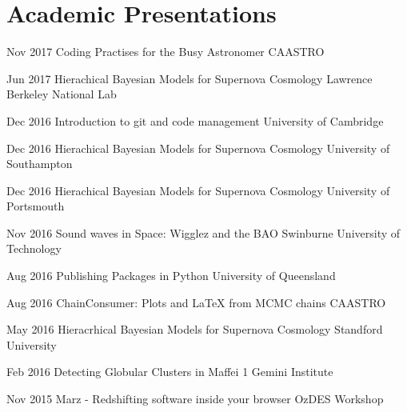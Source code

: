 \documentclass[]{friggeri-cv} %
\begin{document}
\section{Academic Presentations}
\begin{entrylist}
	\entryInlineSmall
	{Nov 2017}
	{Coding Practises for the Busy Astronomer}
	{CAASTRO}
	{}
\end{entrylist}
\begin{entrylist}
	\entryInlineSmall
	{Jun 2017}
	{Hierachical Bayesian Models for Supernova Cosmology}
	{Lawrence Berkeley National Lab}
	{}
\end{entrylist}
\begin{entrylist}
	\entryInlineSmall
	{Dec 2016}
	{Introduction to git and code management}
	{University of Cambridge}
	{}
\end{entrylist}
\begin{entrylist}
	\entryInlineSmall
	{Dec 2016}
	{Hierachical Bayesian Models for Supernova Cosmology}
	{University of Southampton}
	{}
\end{entrylist}
\begin{entrylist}
	\entryInlineSmall
	{Dec 2016}
	{Hierachical Bayesian Models for Supernova Cosmology}
	{University of Portsmouth}
	{}
\end{entrylist}
\begin{entrylist}
	\entryInlineSmall
	{Nov 2016}
	{Sound waves in Space: Wigglez and the BAO}
	{Swinburne University of Technology}
	{}
\end{entrylist}
\begin{entrylist}
	\entryInlineSmall
	{Aug 2016}
	{Publishing Packages in Python}
	{University of Queensland}
	{}
\end{entrylist}
\begin{entrylist}
	\entryInlineSmall
	{Aug 2016}
	{ChainConsumer: Plots and LaTeX from MCMC chains}
	{CAASTRO}
	{}
\end{entrylist}
\begin{entrylist}
	\entryInlineSmall
	{May 2016}
	{Hieracrhical Bayesian Models for Supernova Cosmology}
	{Standford University}
	{}
\end{entrylist}
\begin{entrylist}
	\entryInlineSmall
	{Feb 2016}
	{Detecting Globular Clusters in Maffei 1}
	{Gemini Institute}
	{}
\end{entrylist}
\begin{entrylist}
	\entryInlineSmall
	{Nov 2015}
	{Marz - Redshifting software inside your browser}
	{OzDES Workshop}
	{}
\end{entrylist}
\end{document}
